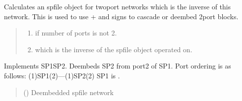 \documentclass[letterpaper,10pt,english]{sphinxmanual}
\begin{document}
\begin{fulllineitems}
\begin{fulllineitems}
\label{\detokenize{touchstone:touchstone.spfile.__neg__}}
\pysigstartsignatures
{}
\pysigstopsignatures
\sphinxAtStartPar
Calculates an spfile object for two\sphinxhyphen{}port networks which is the inverse of this network. This is used to use + and \sphinxhyphen{} signs to cascade or deembed 2\sphinxhyphen{}port blocks.
\begin{quote}\begin{description}
\sphinxAtStartPar
\begin{enumerate}
%
\item {} 
\sphinxAtStartPar
{} if number of ports is not 2.

\item {} 
\sphinxAtStartPar
{} which is the inverse of the spfile object operated on.

\end{enumerate}


\sphinxAtStartPar
{\hyperref[\detokenize{touchstone:touchstone.spfile}]{}}

\end{description}\end{quote}

\end{fulllineitems}


\begin{fulllineitems}
\label{\detokenize{touchstone:touchstone.spfile.__sub__}}
\pysigstartsignatures
{}
\pysigstopsignatures
\sphinxAtStartPar
Implements SP1\sphinxhyphen{}SP2.
Deembeds SP2 from port\sphinxhyphen{}2 of SP1.
Port ordering is as follows:
(1)\sphinxhyphen{}SP1\sphinxhyphen{}(2)—(1)\sphinxhyphen{}SP2\sphinxhyphen{}(2)
SP1 is .
\begin{quote}\begin{description}
\sphinxAtStartPar
{} ({\hyperref[\detokenize{touchstone:touchstone.spfile}]{}}) \textendash{} Deembedded spfile network


\end{description}
\end{quote}
\end{fulllineitems}
\end{fulllineitems}
\end{document}
